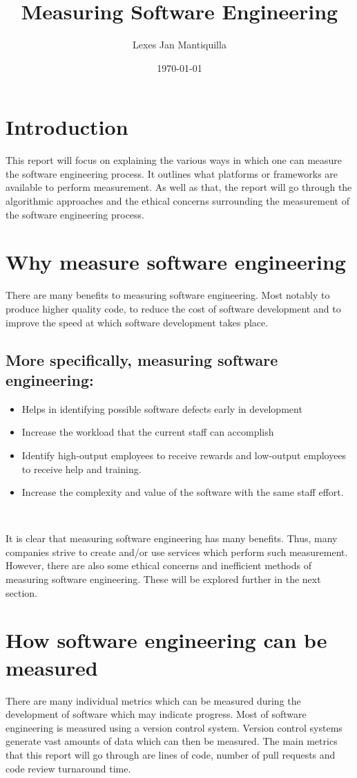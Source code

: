 \documentclass{article}
\title{Measuring Software Engineering}
\author{Lexes Jan Mantiquilla}
\date{\today}
\begin{document}
\maketitle
\tableofcontents
\newpage

\section{Introduction}
This report will focus on explaining the various ways in which one can measure
the software engineering process. It outlines what platforms or frameworks are
available to perform measurement. As well as that, the report will go through
the algorithmic approaches and the ethical concerns surrounding the measurement
of the software engineering process.

\section{Why measure software engineering}
There are many benefits to measuring software engineering. Most notably to
produce higher quality code, to reduce the cost of software development and to
improve the speed at which software development takes place.
\subsection{More specifically, measuring software engineering:}
\begin{itemize}
  \item Helps in identifying possible software defects early in development
  \item Increase the workload that the current staff can accomplish
  \item Identify high-output employees to receive rewards and low-output
    employees to receive help and training.
  \item Increase the complexity and value of the software with the same staff
    effort.
\end{itemize}
~\cite{scacchi1995understanding}

It is clear that measuring software engineering has many benefits. Thus, many
companies strive to create and/or use services which perform such measurement.
However, there are also some ethical concerns and inefficient methods of
measuring software engineering. These will be explored further in the next
section.

\section{How software engineering can be measured}
There are many individual metrics which can be measured during the development
of software which may indicate progress. Most of software engineering is
measured using a version control system. Version control systems generate vast
amounts of data which can then be measured. The main metrics that this report
will go through are lines of code, number of pull requests and code review
turnaround time.
\end{document}

